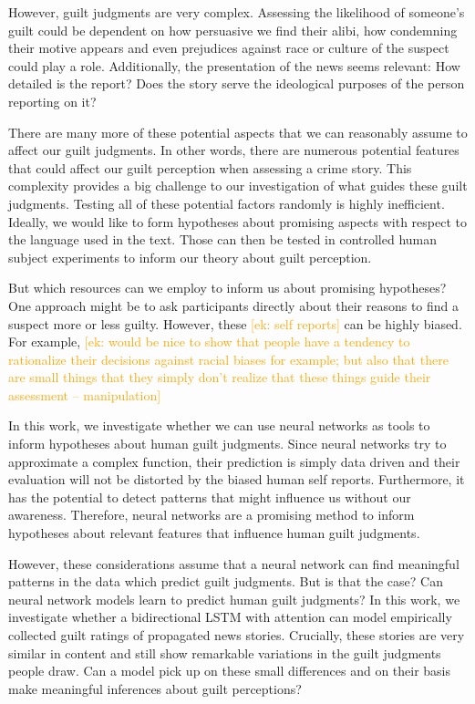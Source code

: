 \documentclass[11pt,a4paper]{article}
\newcommand{\ek}[1]{\textcolor{Orange}{[ek: #1]}}
\begin{document}
However, guilt judgments are very complex. Assessing the likelihood of someone's guilt could be dependent on how persuasive we find their alibi, how condemning their motive appears and even prejudices against race or culture of the suspect could play a role. Additionally, the presentation of the news seems relevant: How detailed is the report? Does the story serve the ideological purposes of the person reporting on it? 

There are many more of these potential aspects that we can reasonably assume to affect our guilt judgments. In other words, there are numerous potential features that could affect our guilt perception when assessing a crime story. This complexity provides a big challenge to our investigation of what guides these guilt judgments. Testing all of these potential factors randomly is highly inefficient. Ideally, we would like to form hypotheses about promising aspects with respect to the language used in the text. Those can then be tested in controlled human subject experiments to inform our theory about guilt perception.

But which resources can we employ to inform us about promising hypotheses? One approach might be to ask participants directly about their reasons to find a suspect more or less guilty. However, these \ek{self reports} can be highly biased. For example, \ek{would be nice to show that people have a tendency to rationalize their decisions against racial biases for example; but also that there are small things that they simply don't realize that these things guide their assessment -- manipulation}

In this work, we investigate whether we can use neural networks as tools to inform hypotheses about human guilt judgments. Since neural networks try to approximate a complex function, their prediction is simply data driven and their evaluation will not be distorted by the biased human self reports. Furthermore, it has the potential to detect patterns that might influence us without our awareness. Therefore, neural networks are a promising method to inform hypotheses about relevant features that influence human guilt judgments.

However, these considerations assume that a neural network can find meaningful patterns in the data which predict guilt judgments. But is that the case? Can neural network models learn to predict human guilt judgments? In this work, we investigate whether a bidirectional LSTM with attention can model empirically collected guilt ratings of propagated news stories. Crucially, these stories are very similar in content and still show remarkable variations in the guilt judgments people draw. Can a model pick up on these small differences and on their basis make meaningful inferences about guilt perceptions?
\end{document}
